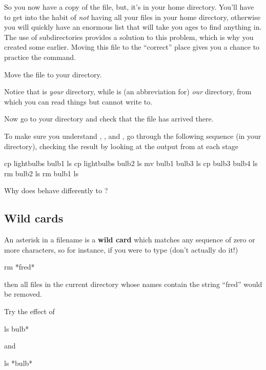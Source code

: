So you now have a copy of the file, but, it's in your home directory.
You'll have to get into the habit of \emph{not} having all your files
in your home directory, otherwise you will quickly have an enormous list
that will take you ages to find anything in. The use of subdirectories
provides a solution to this problem, which is why you created some
earlier. Moving this file to the ``correct'' place gives you a chance
to practice the  command.

Move the file  to your  directory.

Notice that \fname{\crsname} is \emph{your\/} \crsname{} directory, while
\fname{\Dcrsname} is (an abbreviation for) \emph{our\/} \crsname{}
directory, from which you can read things but cannot write to.

Now go to your  directory and check that the file
has arrived there.

To make sure you understand , , and
, go through the following sequence (in your
 directory), checking the result by looking at the
output from  at each stage

\begin{ttoutenv}
  cp lightbulbs bulb1 \return
  ls \return
  cp lightbulbs bulb2 \return
  ls \return
  mv bulb1 bulb3 \return
  ls \return
  cp bulb3 bulb4 \return
  ls \return
  rm bulb2 \return
  ls \return
  rm bulb1 \return
  ls \return
\end{ttoutenv}
Why does  behave differently to ?

\subsection{Wild cards}
An asterisk in a filename is a \textbf{wild card} which matches any sequence of
zero or more characters, so for instance, if you were to type (don't
actually do it!)
%
\begin{ttoutenv}
  rm *fred*\return
\end{ttoutenv}
%
then all files in the current directory whose names contain the string
``fred'' would be removed.

Try the effect of
%
\begin{ttoutenv}
  ls bulb*\return
\end{ttoutenv}
%
and
%
\begin{ttoutenv}
  ls *bulb*\return
\end{ttoutenv}

